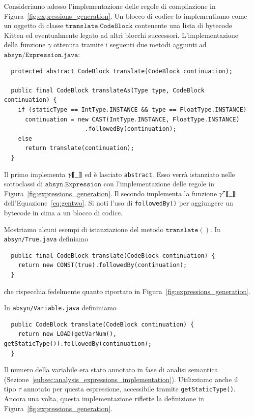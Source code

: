 Consideriamo adesso l'implementazione delle regole di compilazione
in Figura~\ref{fig:expressions_generation}. Un blocco di codice
lo implementiamo come un oggetto di classe
$\mathtt{translate.CodeBlock}$ contenente una lista
di bytecode Kitten ed eventualmente legato ad altri blocchi successori.
L'implementazione della funzione $\gamma$ \e
ottenuta tramite i seguenti due metodi aggiunti
ad $\mathtt{absyn/Expression.java}$:
%
\begin{verbatim}
  protected abstract CodeBlock translate(CodeBlock continuation);

  public final CodeBlock translateAs(Type type, CodeBlock continuation) {
    if (staticType == IntType.INSTANCE && type == FloatType.INSTANCE)
      continuation = new CAST(IntType.INSTANCE, FloatType.INSTANCE)
                       .followedBy(continuation);
    else
      return translate(continuation);
  }
\end{verbatim}
%
Il primo implementa ${\gamma[\![{\_}]\!]}$ ed
\`e lasciato \texttt{abstract}. Esso verr\`a istanziato nelle
sottoclassi di $\mathtt{absyn.Expression}$
con l'implementazione delle regole in
Figura~\ref{fig:expressions_generation}. Il secondo implementa la funzione
${\gamma^{{\tau}}[\![{\_}]\!]}$ dell'Equazione~\ref{eq:gentwo}. Si noti l'uso di
\texttt{followedBy()} per aggiungere un bytecode in cima a un blocco di codice.

Mostriamo alcuni esempi di istanziazione del metodo
$\mathtt{translate()}$. In \texttt{absyn/True.java} definiamo
%
\begin{verbatim}
  public final CodeBlock translate(CodeBlock continuation) {
    return new CONST(true).followedBy(continuation);
  }
\end{verbatim}
%
che rispecchia fedelmente quanto riportato in
Figura~\ref{fig:expressions_generation}.

In \texttt{absyn/Variable.java} defininiamo
%
\begin{verbatim}
  public CodeBlock translate(CodeBlock continuation) {
    return new LOAD(getVarNum(), getStaticType()).followedBy(continuation);
  }
\end{verbatim}
%
Il numero della variabile era stato annotato in fase di analisi semantica
(Sezione~\ref{subsec:analysis_expressions_implementation}).
Utilizziamo anche il tipo
$\tau$ annotato per questa espressione, accessibile tramite
\texttt{getStaticType()}. Ancora una volta, questa implementazione
riflette la definizione in Figura~\ref{fig:expressions_generation}.

